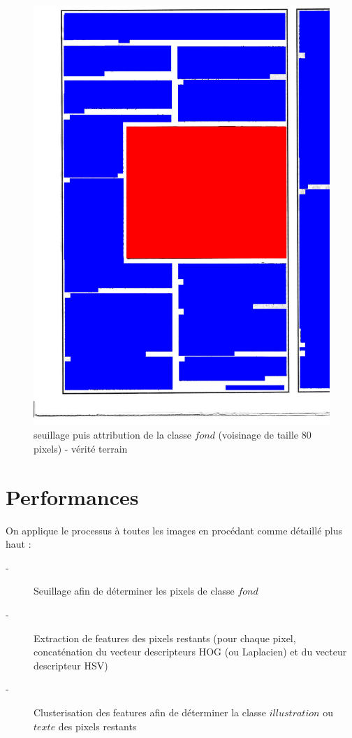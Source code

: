 \documentclass{book}
\begin{document}
\begin{figure}[H]
\begin{center}
\includegraphics[scale=0.2]{images/1g_m.jpg}
\end{center}
\caption{seuillage puis attribution de la classe $fond$ (voisinage de taille 80 pixels) - vérité terrain}
\label{resultat}
\end{figure}


\chapter{Performances}


On applique le processus à toutes les images en procédant comme détaillé plus haut :

\begin{description}
 \item[-] Seuillage afin de déterminer les pixels de classe $fond$
 \item[-] Extraction de features des pixels restants (pour chaque pixel, concaténation du vecteur descripteurs HOG (ou Laplacien) et du vecteur descripteur HSV)
 \item[-] Clusterisation des features afin de déterminer la classe $illustration$ ou $texte$ des pixels restants
\end{description}
\end{document}
